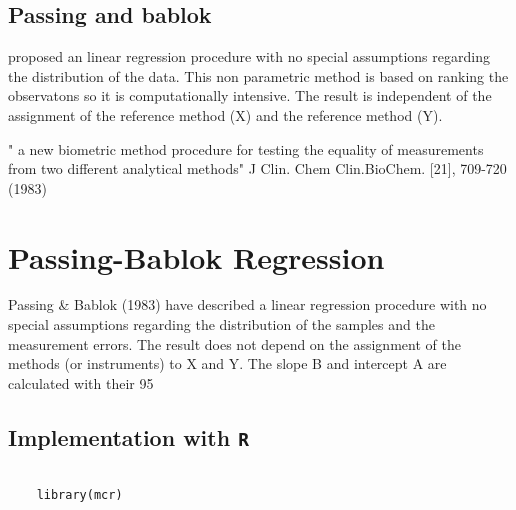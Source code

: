 \subsection{Passing and bablok}
proposed an linear regression procedure with no special assumptions regarding the distribution of the data.
This non parametric method is based on ranking the observatons so it is computationally intensive.
The result is independent of the assignment of the reference method (X) and the reference method (Y).

" a new biometric method procedure for testing the equality of measurements from two different analytical methods"
J Clin. Chem Clin.BioChem. [21], 709-720 (1983)
\section{Passing-Bablok Regression}


Passing & Bablok (1983) have described a linear regression procedure with no special assumptions regarding the distribution of the samples and the measurement errors. The result does not depend on the assignment of the methods (or instruments) to X and Y. The slope B and intercept A are calculated with their 95%

\subsection{Implementation with \texttt{R}}

\begin{framed}
	\begin{verbatim}
	
	library(mcr)
	
	\end{verbatim}
\end{framed}

